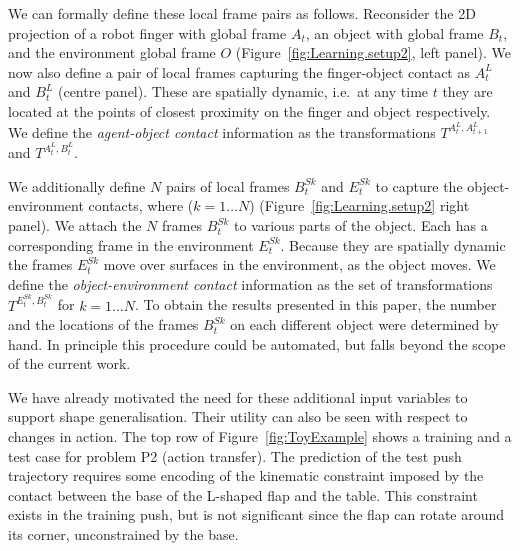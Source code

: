 We can formally define these local frame pairs as follows. Reconsider
the 2D projection of a robot finger with global frame $A_{t}$, an
object with global frame $B_{t}$, and the environment global frame $O$
(Figure~\ref{fig:Learning.setup2}, left panel). We now also define a pair of local frames
capturing the finger-object contact as $A^{L}_{t}$ and
$B^{L}_{t}$ (centre panel). These are spatially dynamic, i.e.\ at any time $t$ they
are located at the points of closest proximity on the finger and
object respectively.  We define the \textit{agent-object contact}
information as the transformations $T^{A^{L}_{t}, A^{L}_{t+1}}$ and
$T^{A^{L}_t, B^{L}_t}$.

We additionally define $N$ pairs of local frames $B^{Sk}_t$ and $E^{Sk}_t$ to
capture the object-environment contacts, where ($k=1 \ldots N$) (Figure~\ref{fig:Learning.setup2} right panel). We attach the $N$ frames $B^{Sk}_t$
to various parts of the object. Each has a corresponding frame in the
environment $E^{Sk}_t$.  Because they are spatially dynamic the
frames $E^{Sk}_t$ move over surfaces in the environment, as the
object moves. We define the \textit{object-environment contact}
information as the set of transformations $T^{E^{Sk}_t,B^{Sk}_t}$ for $k=1
\ldots N$. To obtain the results presented in this paper, the number and the
locations of the frames $B^{Sk}_t$ on each different object were
determined by hand. In principle this procedure could be automated,
but falls beyond the scope of the current work.

We have already motivated the need for these additional input
variables to support shape generalisation. Their utility can also be seen with respect to changes in
action. The top row of Figure~\ref{fig:ToyExample} shows a training
and a test case for problem P2 (action transfer). The prediction of the test push trajectory requires some encoding of the kinematic constraint
imposed by the contact between the base of the L-shaped flap and the
table. This constraint exists in the training push, but is not
significant since the flap can rotate around its corner, unconstrained
by the base.

